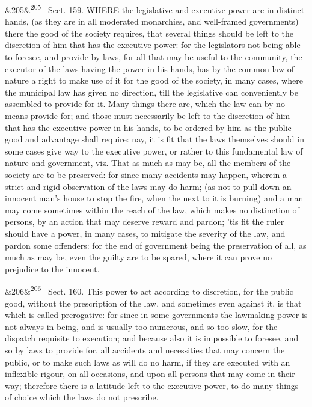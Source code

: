 \documentclass[12pt]{article}
\newcommand{\para}[1][]{\par\noindent\ifx&#1&\else\textsuperscript{\footnotesize #1}~\fi}
\begin{document}
\para[205] Sect. 159. WHERE the legislative and executive power are in distinct hands, (as they are in all moderated monarchies, and well-framed governments) there the good of the society requires, that several things should be left to the discretion of him that has the executive power: for the legislators not being able to foresee, and provide by laws, for all that may be useful to the community, the executor of the laws having the power in his hands, has by the common law of nature a right to make use of it for the good of the society, in many cases, where the municipal law has given no direction, till the legislative can conveniently be assembled to provide for it. Many things there are, which the law can by no means provide for; and those must necessarily be left to the discretion of him that has the executive power in his hands, to be ordered by him as the public good and advantage shall require: nay, it is fit that the laws themselves should in some cases give way to the executive power, or rather to this fundamental law of nature and government, viz. That as much as may be, all the members of the society are to be preserved: for since many accidents may happen, wherein a strict and rigid observation of the laws may do harm; (as not to pull down an innocent man's house to stop the fire, when the next to it is burning) and a man may come sometimes within the reach of the law, which makes no distinction of persons, by an action that may deserve reward and pardon; 'tis fit the ruler should have a power, in many cases, to mitigate the severity of the law, and pardon some offenders: for the end of government being the preservation of all, as much as may be, even the guilty are to be spared, where it can prove no prejudice to the innocent.

\para[206] Sect. 160. This power to act according to discretion, for the public good, without the prescription of the law, and sometimes even against it, is that which is called prerogative: for since in some governments the lawmaking power is not always in being, and is usually too numerous, and so too slow, for the dispatch requisite to execution; and because also it is impossible to foresee, and so by laws to provide for, all accidents and necessities that may concern the public, or to make such laws as will do no harm, if they are executed with an inflexible rigour, on all occasions, and upon all persons that may come in their way; therefore there is a latitude left to the executive power, to do many things of choice which the laws do not prescribe.
\end{document}
